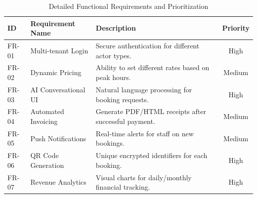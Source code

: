 \begin{table}[htbp]
\centering
\begin{tabularx}{\textwidth}{|l|l|X|c|}
\hline
\rowcolor{LightCyan}
\textbf{ID} & \textbf{Requirement Name} & \textbf{Description} & \textbf{Priority} \\ \hline
FR-01 & Multi-tenant Login & Secure authentication for different actor types. & High \\ \hline
FR-02 & Dynamic Pricing & Ability to set different rates based on peak hours. & Medium \\ \hline
FR-03 & AI Conversational UI & Natural language processing for booking requests. & High \\ \hline
FR-04 & Automated Invoicing & Generate PDF/HTML receipts after successful payment. & Medium \\ \hline
FR-05 & Push Notifications & Real-time alerts for staff on new bookings. & Medium \\ \hline
FR-06 & QR Code Generation & Unique encrypted identifiers for each booking. & High \\ \hline
FR-07 & Revenue Analytics & Visual charts for daily/monthly financial tracking. & High \\ \hline
\end{tabularx}
\caption{Detailed Functional Requirements and Prioritization}
\label{tab:detailed_reqs}
\end{table}

